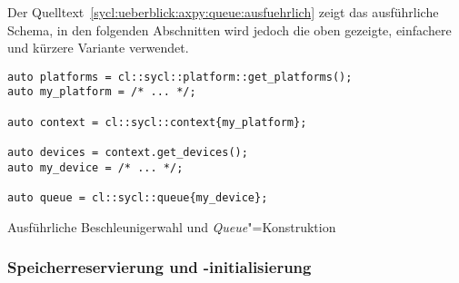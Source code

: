 Der Quelltext~\ref{sycl:ueberblick:axpy:queue:ausfuehrlich} zeigt das
ausführliche Schema, in den folgenden Abschnitten wird jedoch die oben gezeigte,
einfachere und kürzere Variante verwendet.

\begin{code}
    \begin{verbatim}
auto platforms = cl::sycl::platform::get_platforms();
auto my_platform = /* ... */;

auto context = cl::sycl::context{my_platform};

auto devices = context.get_devices();
auto my_device = /* ... */;

auto queue = cl::sycl::queue{my_device};
    \end{verbatim}
    \caption{Ausführliche Beschleunigerwahl und \textit{Queue}"=Konstruktion}
    \label{sycl:ueberblick:axpy:queue:ausfuehrlich}
\end{code}

\subsubsection{Speicherreservierung und -initialisierung}
\label{sycl:ueberblick:axpy:buffer}

